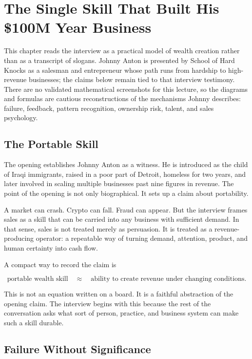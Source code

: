 \chapter{The Single Skill That Built His \$100M Year Business}

This chapter reads the interview as a practical model of wealth creation rather than as a transcript of slogans. Johnny Anton is presented by School of Hard Knocks as a salesman and entrepreneur whose path runs from hardship to high-revenue businesses; the claims below remain tied to that interview testimony. There are no validated mathematical screenshots for this lecture, so the diagrams and formulas are cautious reconstructions of the mechanisms Johnny describes: failure, feedback, pattern recognition, ownership risk, talent, and sales psychology.

\section{The Portable Skill}

The opening establishes Johnny Anton as a witness. He is introduced as the child of Iraqi immigrants, raised in a poor part of Detroit, homeless for two years, and later involved in scaling multiple businesses past nine figures in revenue. The point of the opening is not only biographical. It sets up a claim about portability.

A market can crash. Crypto can fall. Fraud can appear. But the interview frames sales as a skill that can be carried into any business with sufficient demand. In that sense, sales is not treated merely as persuasion. It is treated as a revenue-producing operator: a repeatable way of turning demand, attention, product, and human certainty into cash flow.

A compact way to record the claim is

\begin{equation}
\text{portable wealth skill}
\quad \approx \quad
\text{ability to create revenue under changing conditions}.
\end{equation}

This is not an equation written on a board. It is a faithful abstraction of the opening claim. The interview begins with this because the rest of the conversation asks what sort of person, practice, and business system can make such a skill durable.

\section{Failure Without Significance}


